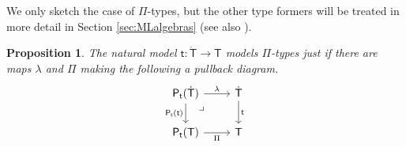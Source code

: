 \documentclass[12pt,reqno]{amsart}
\newcommand{\alg}[1]{\ensuremath{\mathsf{#1}}}
\renewcommand{\to}{\ensuremath{\rightarrow}}
\renewcommand{\t}{\ensuremath{\mathsf{t}}}
\newcommand{\tT}{\ensuremath{{\t}:\TT\to\T}}
\newcommand{\T}{\ensuremath{\mathsf{T}}}
\newcommand{\TT}{\ensuremath{\dot{\mathsf{T}}}}
\newcommand{\pbcorner}{\arrow[dr,phantom,"\lrcorner" very near start, shift right=.5ex]} %
\newtheorem{proposition}[theorem]{Proposition}
\theoremstyle{remark}
\theoremstyle{definition}
\begin{document}
We only sketch the case of $\Pi$-types, but the other type formers will be treated in more detail in Section \ref{sec:MLalgebras} (see also \cite{Awodey:NM, Newstead, Awodey-Newstead}).

\begin{proposition}  The natural model $\tT$ models $\Pi$-types just if there are maps $\lambda$ and $\Pi$ making the following a pullback diagram. 
\begin{equation}\label{diag:prod2}
\begin{tikzcd}
\alg{P}_\t(\TT)  \ar[d,swap, "{\alg{P}_\t(\t)}"]   \ar[r, "\lambda"]  \pbcorner &  \TT \ar[d, "{\t}"]\\
\alg{P}_\t(\T)	\ar[r,swap, "{\Pi}"] & \T
\end{tikzcd}
\end{equation}
\end{proposition}
%
\end{document}
